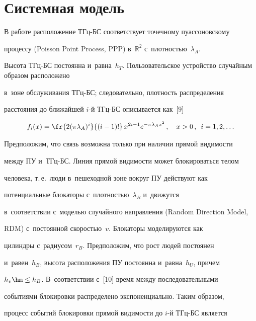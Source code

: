 \section{Системная модель}


  


  В работе расположение ТГц-БС соответствует точечному пуассоновскому 


процессу (Poisson Point Process, PPP) в~$\mathbb{R}^2$ с~плот\-ностью~$\lambda_A$. 


Высота ТГц-БС постоянна и~равна~$h_T$. Пользовательское устройство случайным образом расположено 


в~зоне обслуживания ТГц-БС; следовательно, плот\-ность распределения 


рас\-сто\-яния до ближайшей $i$-й ТГц-БС описывается как~[9]


  \begin{equation*}


  f_i(x)=\fr{2(\pi \lambda_A)^i}{(i-1)!}\,x^{2i-1} e^{-\pi \lambda_A x^2}\,,\quad 


x>0\,,\enskip i=1,2,\ldots




  \end{equation*}


     


     Предположим, что связь возможна только при наличии прямой ви\-ди\-мости 


между ПУ и~ТГц-БС. Линия прямой ви\-ди\-мости может блокироваться телом 


человека, т.\,е.\ люди в~пешеходной зоне вокруг ПУ действуют как 


потенциальные блокаторы с~плот\-ностью~$\lambda_B$ и~движутся 


в~соответствии с~мо\-делью случайного на\-прав\-ле\-ния (Random Direction Model, 


RDM) с~по\-сто\-ян\-ной ско\-ростью~$v$. Блокаторы моделируются как 


цилиндры с~радиусом~$r_B$. Предположим, что рост людей постоянен 


и~равен~$h_B$, высота расположения ПУ постоянна и~рав\-на~$h_U$, причем 


$h_v\hm \leq h_B$. В~соответствии с~[10] время между последовательными 


событиями блокировки распределено экспоненциально. Таким образом, 


процесс событий блокировки прямой ви\-ди\-мости до $i$-й ТГц-БС является 


